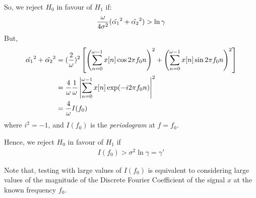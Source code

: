 \documentclass[10pt]{article}
\begin{document}
So, we reject $H_0$ in favour of $H_1$ if:
\[ \frac{\omega}{4\sigma^2}(\Hat{{\alpha_1}}^2+\Hat{{\alpha_2}}^2)>\ln \gamma \]
But, 
\begin{align*}
\Hat{{\alpha_1}}^2+\Hat{{\alpha_2}}^2&=(\dfrac{2}{\omega})^2\left[\left(\displaystyle\sum_{n=0}^{\omega-1}x[n]\cos{2\pi f_0n}\right)^2 + \left(\displaystyle\sum_{n=0}^{\omega-1}x[n]\sin {2\pi f_0n}\right)^2 \right]\\
&=\dfrac{4}{\omega}\dfrac{1}{\omega}\left|\displaystyle\sum_{n=0}^{\omega-1}x[n]\exp(-i2\pi f_0n)\right|^2\\
&=\dfrac{4}{\omega}I(f_0)\\
\end{align*}
where $i^2=-1$, and $I(f_0)$ is the \textit{periodogram} at $f=f_0$. 

Hence, we reject $H_0$ in favour of $H_1$ if
\begin{align}
 I(f_0)>\sigma^2\ln \gamma=\gamma'
 \label{EQN}
\end{align}

Note that, testing with large values of $I(f_0)$ is equivalent to considering large values of the magnitude of the Discrete Fourier Coefficient of the signal $x$ at the known frequency $f_0$.
\end{document}
